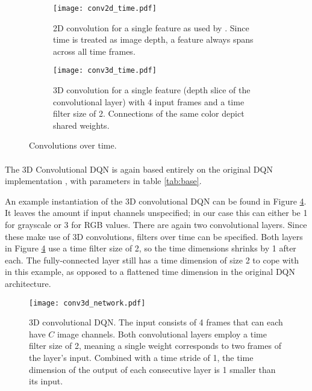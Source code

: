 \begin{figure}[!htpb]
  \begin{subfigure}[t]{.45\textwidth}
    \centering
    \texttt{[image: conv2d\_time.pdf]}
    \caption{
      2D convolution for a single feature as used by \cite{Mnih2013}.
      Since time is treated as image depth,
      a feature always spans across all time frames.
    }
    \label{fig:conv2d_time}
  \end{subfigure}
  \hfill
  \begin{subfigure}[t]{.45\textwidth}
    \centering
    \texttt{[image: conv3d\_time.pdf]}
    \caption{
      3D convolution for a single feature
      (depth slice of the convolutional layer)
      with 4 input frames
      and a time filter size of 2.
      Connections of the same color depict shared weights.
    }
    \label{fig:conv3d_time}
  \end{subfigure}
  \caption{
    Convolutions over time.
  }
  \label{fig:conv3d}
\end{figure}

\paragraph{}
The 3D Convolutional DQN
is again based entirely on the original DQN implementation
\parencite{Mnih2013},
with parameters in table \ref{tab:base}.

An example instantiation of the 3D convolutional DQN
can be found in Figure \ref{fig:conv3d_network}.
It leaves the amount if input channels unspecified;
in our case this can either be 1 for grayscale
or 3 for RGB values.
There are again two convolutional layers.
Since these make use of 3D convolutions,
filters over time can be specified.
Both layers in Figure \ref{fig:conv3d_network}
use a time filter size of 2,
so the time dimensions shrinks by 1 after each.
The fully-connected layer
still has a time dimension of size 2 to cope with in this example,
as opposed to a flattened time dimension in the original DQN architecture.

\begin{figure}[htpb]
  \centering
  \texttt{[image: conv3d\_network.pdf]}
  \caption{
    3D convolutional DQN.
    The input consists of 4 frames
    that can each have $C$ image channels.
    Both convolutional layers employ a time filter size of 2,
    meaning a single weight corresponds to
    two frames of the layer's input.
    Combined with a time stride of 1,
    the time dimension of the output of each consecutive layer
    is 1 smaller than its input.
  }
  \label{fig:conv3d_network}
\end{figure}

